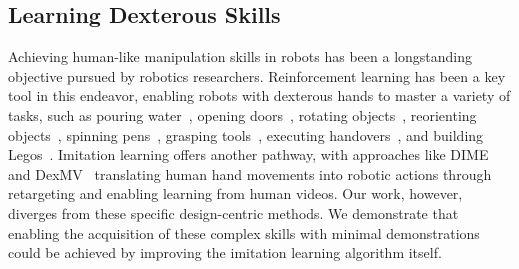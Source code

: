 \subsection{Learning Dexterous Skills} 
Achieving human-like manipulation skills in robots has been a longstanding objective pursued by robotics researchers. Reinforcement learning has been a key tool in this endeavor, enabling robots with dexterous hands to master a variety of tasks, such as pouring water~\citep{qin2022dexmv,ze2023hindex}, opening doors~\citep{rajeswaran2017dapg,hansen2023modem,chen2022bidexhands}, rotating objects~\citep{qi2023hora,yin2023rotating,yuan2023robot_synthethesia,qi2023general_hora}, reorienting objects~\citep{handa2023dextreme,chen2023visual_dex,chen2022system}, spinning pens~\citep{ma2023eureka}, grasping tools~\citep{agarwal2023functional}, executing handovers~\citep{zhang2023flexible_handover,huang2023dynamic_handover}, and building Legos~\citep{chen2023sequential}. Imitation learning offers another pathway, with approaches like DIME~\citep{arunachalam2023dime} and DexMV~\citep{qin2022dexmv} translating human hand movements into robotic actions through retargeting and enabling learning from human videos. Our work, however, diverges from these specific design-centric methods. We demonstrate that enabling the acquisition of these complex skills with minimal demonstrations could be achieved by improving the imitation learning algorithm itself. 
